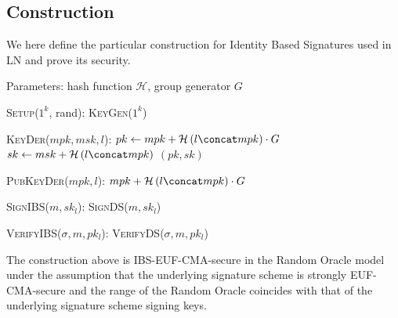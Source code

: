   \subsection{Construction}
    We here define the particular construction for Identity Based Signatures
    used in LN and prove its security.

    Parameters: hash function $\mathcal{H}$, group generator $G$
    \begin{algorithmic}[0]
      \State \textsc{Setup}($1^k$, rand):
      \Indent
        \State \Return \textsc{KeyGen}($1^k$)
      \EndIndent
    \end{algorithmic}

    \begin{algorithmic}[0]
      \State \textsc{KeyDer}($mpk, msk, l$):
      \Indent
        \State $pk \gets mpk + \mathcal{H}\left(l \concat mpk\right) \cdot G$
        \State $sk \gets msk + \mathcal{H}\left(l \concat mpk\right)$
        \State \Return $(pk, sk)$
      \EndIndent
    \end{algorithmic}

    \begin{algorithmic}[0]
      \State \textsc{PubKeyDer}($mpk, l$):
      \Indent
        \State \Return $mpk + \mathcal{H}\left(l \concat mpk\right) \cdot G$
      \EndIndent
    \end{algorithmic}

    \begin{algorithmic}[0]
      \State \textsc{SignIBS}($m, sk_l$):
      \Indent
        \State \Return \textsc{SignDS}($m, sk_l$)
      \EndIndent
    \end{algorithmic}

    \begin{algorithmic}[0]
      \State \textsc{VerifyIBS}($\sigma, m, pk_l$):
      \Indent
        \State \Return \textsc{VerifyDS}($\sigma, m, pk_l$)
      \EndIndent
    \end{algorithmic}

    \begin{lemma}
      \label{lemma:ibs}
      The construction above is \textsf{IBS-EUF-CMA}-secure in the Random Oracle
      model under the assumption that the underlying signature scheme is
      strongly \textsf{EUF-CMA}-secure and the range of the Random Oracle
      coincides with that of the underlying signature scheme signing keys.
    \end{lemma}

